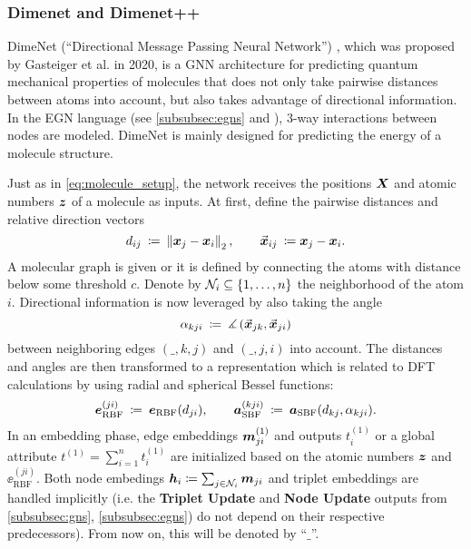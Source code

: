 \subsubsection{Dimenet and Dimenet++}
\label{subsubsec:dimenet}

DimeNet (\enquote{Directional Message Passing Neural Network}) 
\cite{DBLP:journals/corr/abs-2003-03123}, which was proposed by Gasteiger et al. 
in 2020, is a GNN architecture for predicting quantum mechanical properties
of molecules that does not only take pairwise distances between atoms into
account, but also takes advantage of directional information. In the EGN 
language (see \ref{subsubsec:egns} and \cite{https://doi.org/10.48550/arxiv.2203.09697}),
3-way interactions between nodes are modeled. DimeNet is mainly designed for 
predicting the energy of a molecule structure.

Just as in \eqref{eq:molecule_setup}, the network receives the positions $\boldsymbol{X}$
and atomic numbers $\boldsymbol{z}$ of a molecule as inputs. 
At first, define the pairwise distances and relative direction vectors
\[
    d_{ij} \: \coloneqq \: \left\lVert\boldsymbol{x}_j - \boldsymbol{x}_i\right\rVert_2, 
    \qquad \vec{\boldsymbol{x}}_{ij} \: \coloneqq \boldsymbol{x}_j - \boldsymbol{x}_i \text{.}
\]
A molecular graph is given or it is defined by connecting the atoms with distance 
below some threshold $c$. Denote by $\mathcal{N}_i \subseteq \left\{1, \dots, n\right\}$ the 
neighborhood of the atom $i$.
Directional information is now leveraged by also 
taking the angle
\[
    \alpha_{kji} \: \coloneqq \: \measuredangle\left( \vec{\boldsymbol{x}}_{jk}, \vec{\boldsymbol{x}}_{ji} \right)
\]
between neighboring edges $(\_,k,j)$ and $(\_,j,i)$ into account. 
The distances and angles are then transformed to a representation which is related
to DFT calculations \cite[Section 5]{DBLP:journals/corr/abs-2003-03123}
by using radial and spherical Bessel functions:
\[
    \boldsymbol{e}_{\text{RBF}}^{(ji)} \: \coloneqq \: \boldsymbol{e}_{\text{RBF}}(d_{ji}), 
    \qquad \boldsymbol{a}_{\text{SBF}}^{(kji)} \: \coloneqq \: \boldsymbol{a}_{\text{SBF}}(d_{kj}, \alpha_{kji})
    \text{.}
\]
In an embedding phase, edge embeddings $\boldsymbol{m}_{ji}^{(1)}$ and outputs
$t_{i}^{(1)}$ or a global attribute $t^{(1)} = \sum_{i=1}^n t_i^{(1)}$ are initialized based
on the atomic numbers $\boldsymbol{z}$ and $\ee_{\text{RBF}}^{(ji)}$. Both node embedings 
$\boldsymbol{h}_i \coloneqq \sum_{j \in \mathcal{N}_i} \boldsymbol{m}_{ji}$ and triplet embeddings are handled
implicitly (i.e. the \textbf{Triplet Update} and \textbf{Node Update} outputs from 
\ref{subsubsec:gns}, \ref{subsubsec:egns}) do not depend on their respective predecessors).
From now on, this will be denoted by \enquote{$\_$}.

